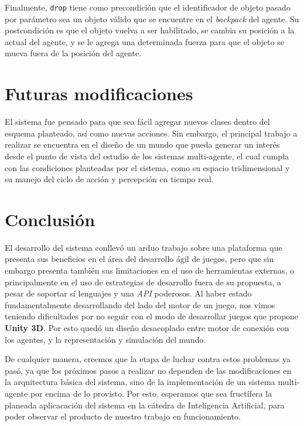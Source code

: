 \documentclass[a4paper,oneside]{article}
\begin{document}
Finalmente, \texttt{drop} tiene como precondición que el identificador de objeto pasado
por parámetro sea un objeto válido que se encuentre en el \textit{backpack} del agente.
Su postcondición es que el objeto vuelva a ser habilitado, se cambia su posición a la 
actual del agente, y se le agrega una determinada fuerza para que el objeto se mueva 
fuera de la posición del agente.


\section{Futuras modificaciones}

El sistema fue pensado para que sea fácil agregar nuevos clases dentro del esquema 
planteado, así como nuevas acciones. Sin embargo, el principal trabajo a realizar se 
encuentra en el diseño de un mundo que pueda generar un interés desde el punto de vista
del estudio de los sistemas multi-agente, el cual cumpla con las condiciones planteadas
por el sistema, como su espacio tridimensional y su manejo del ciclo de acción y 
percepción en tiempo real. 

\section{Conclusión}

El desarrollo del sistema conllevó un arduo trabajo sobre una plataforma que presenta
sus beneficios en el área del desarrollo ágil de juegos, pero que sin embargo presenta
también sus limitaciones en el uso de herramientas externas, o principalmente en el uso
de estrategias de desarrollo fuera de su propuesta, a pesar de soportar sí lenguajes
y una \textit{API} poderosos. Al haber estado fundamentalmente desarrollando del lado del
motor de un juego, nos vimos teniendo dificultades por no seguir con el modo de 
desarrollar juegos que propone \textbf{Unity 3D}. Por esto quedó un diseño desacoplado
entre motor de conexión con los agentes, y la representación y simulación del mundo.

De cualquier manera, creemos que la etapa de luchar contra estos problemas ya pasó, ya 
que los próximos pasos a realizar no dependen de las modificaciones en la arquitectura
básica del sistema, sino de la implementación de un sistema multi-agente por encima de 
lo provisto. Por esto, esperamos que sea fructífera la planeada aplicacación del sistema
en la cátedra de Inteligencia Artificial, para poder observar el producto de nuestro 
trabajo en funcionamiento.
\end{document}

